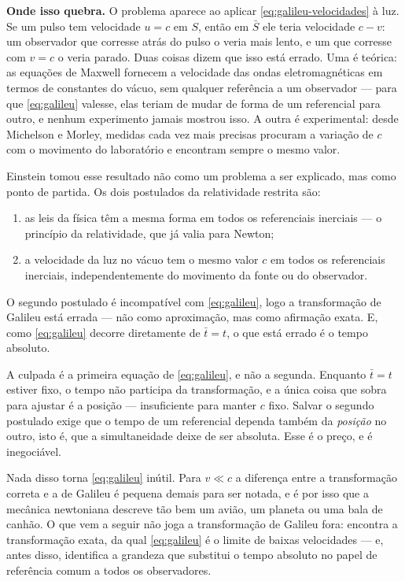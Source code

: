 \documentclass[12pt,a4paper,oneside]{book}
\theoremstyle{rgplain}
\theoremstyle{rgremark}
\begin{document}
\textbf{Onde isso quebra.} O problema aparece ao aplicar
\eqref{eq:galileu-velocidades} à luz. Se um pulso tem velocidade $u=c$ em $S$,
então em $\bar S$ ele teria velocidade $c-v$: um observador que corresse atrás do
pulso o veria mais lento, e um que corresse com $v=c$ o veria parado. Duas
coisas dizem que isso está errado. Uma é teórica: as equações de Maxwell
fornecem a velocidade das ondas eletromagnéticas em termos de constantes do
vácuo, sem qualquer referência a um observador --- para que \eqref{eq:galileu}
valesse, elas teriam de mudar de forma de um referencial para outro, e nenhum
experimento jamais mostrou isso. A outra é experimental: desde
Michelson e Morley, medidas cada vez mais precisas procuram a variação de $c$
com o movimento do laboratório e encontram sempre o mesmo valor.

Einstein tomou esse resultado não como um problema a ser explicado, mas como
ponto de partida. Os dois postulados da relatividade restrita são:

\begin{enumerate}
  \item as leis da física têm a mesma forma em todos os referenciais
  inerciais --- o princípio da relatividade, que já valia para Newton;
  \item a velocidade da luz no vácuo tem o mesmo valor $c$ em todos os
  referenciais inerciais, independentemente do movimento da fonte ou do
  observador.
\end{enumerate}

O segundo postulado é incompatível com \eqref{eq:galileu}, logo a
transformação de Galileu está errada --- não como aproximação, mas como
afirmação exata. E, como \eqref{eq:galileu} decorre diretamente de $\bar t=t$, o
que está errado é o tempo absoluto.

\begin{atencao}
A culpada é a primeira equação de \eqref{eq:galileu}, e não a segunda. Enquanto
$\bar t=t$ estiver fixo, o tempo não participa da transformação, e a única coisa
que sobra para ajustar é a posição --- insuficiente para manter $c$ fixo.
Salvar o segundo postulado exige que o tempo de um referencial dependa também
da \emph{posição} no outro, isto é, que a simultaneidade deixe de ser
absoluta. Esse é o preço, e é inegociável.
\end{atencao}

Nada disso torna \eqref{eq:galileu} inútil. Para $v\ll c$ a diferença entre a
transformação correta e a de Galileu é pequena demais para ser notada, e é por
isso que a mecânica newtoniana descreve tão bem um avião, um planeta ou uma
bala de canhão. O que vem a seguir não joga a transformação de Galileu fora:
encontra a transformação exata, da qual \eqref{eq:galileu} é o limite de
baixas velocidades --- e, antes disso, identifica a grandeza que substitui o
tempo absoluto no papel de referência comum a todos os observadores.
\end{document}
